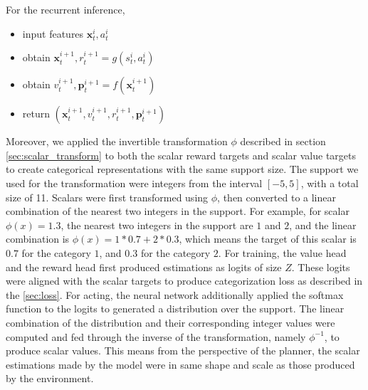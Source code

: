 For the recurrent inference,
\begin{itemize}
    \item input features $\mathbf{x}_t^i, a_t^i$
    \item obtain $\mathbf{x}_t^{i+1}, r_t^{i+1} = g(s_t^i, a_t^i)$
    \item obtain $v^{i+1}_t, \mathbf{p}^{i+1}_t = f(\mathbf{x}_t^{i+1})$
    \item return $(\mathbf{x}^{i+1}_t, v_t^{i+1}, r_t^{i+1}, \mathbf{p}^{i+1}_t)$
\end{itemize}

Moreover, we applied the invertible transformation \( \phi \) described in section \ref{sec:scalar_transform} to both the scalar reward targets and scalar value targets to create categorical representations with the same support size.
The support we used for the transformation were integers from the interval \( [-5, 5] \), with a total size of 11.
Scalars were first transformed using \( \phi \), then converted to a linear combination of the nearest two integers in the support.
For example, for scalar \(\phi(x) = 1.3\), the nearest two integers in the support are $1$ and $2$, and the linear combination is \( \phi(x) = 1 * 0.7 + 2 * 0.3 \), which means the target of this scalar is $0.7$ for the category $1$, and $0.3$ for the category $2$. 
For training, the value head and the reward head first produced estimations as logits of size $Z$.
These logits were aligned with the scalar targets to produce categorization loss as described in the \ref{sec:loss}.
For acting, the neural network additionally applied the softmax function to the logits to generated a distribution over the support.
The linear combination of the distribution and their corresponding integer values were computed and fed through the inverse of the transformation, namely \( \phi^{-1}\), to produce scalar values.
This means from the perspective of the planner, the scalar estimations made by the model were in same shape and scale as those produced by the environment.


